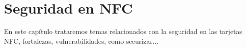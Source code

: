 \chapter{Seguridad en NFC}\label{ch:seguridad}
En este capítulo trataremos temas relacionados con la seguridad en las tarjetas NFC, fortalezas, vulnerabilidades, como securizar... 

